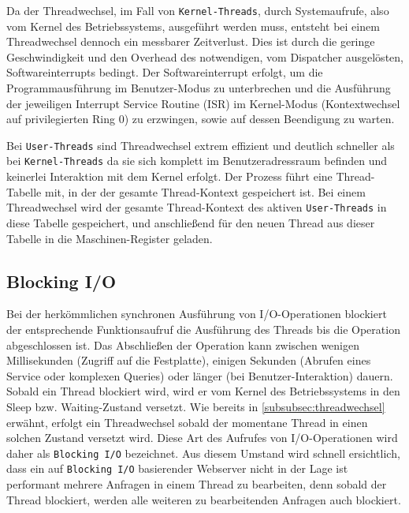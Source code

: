\noindent
Da der Threadwechsel, im Fall von \verb|Kernel-Threads|, durch Systemaufrufe, also vom Kernel des Betriebssystems, ausgeführt werden muss, entsteht
bei einem Threadwechsel dennoch ein messbarer Zeitverlust.
Dies ist durch die geringe Geschwindigkeit und den Overhead des notwendigen, vom Dispatcher ausgelösten, Softwareinterrupts bedingt.
Der Softwareinterrupt erfolgt, um die Programmausführung im Benutzer-Modus zu unterbrechen und die Ausführung der jeweiligen Interrupt Service Routine (ISR) im
Kernel-Modus (Kontextwechsel auf privilegierten Ring 0) zu erzwingen, sowie auf dessen Beendigung zu warten.

Bei \verb|User-Threads| sind Threadwechsel extrem effizient und deutlich schneller als bei \verb|Kernel-Threads|
da sie sich komplett im Benutzeradressraum befinden und keinerlei Interaktion mit dem Kernel erfolgt.
Der Prozess führt eine Thread-Tabelle mit, in der der gesamte Thread-Kontext gespeichert ist.
Bei einem Threadwechsel wird der gesamte Thread-Kontext des aktiven \verb|User-Threads| in diese Tabelle gespeichert, und anschließend für den neuen Thread
aus dieser Tabelle in die Maschinen-Register geladen.
\parencite[Kapitel 2.2.6 Thread Scheduling]{Tanenbaum2016}

\subsection{Blocking I/O}
\label{subsec:blocking-i/o}
Bei der herkömmlichen synchronen Ausführung von I/O-Operationen blockiert der entsprechende Funktionsaufruf die Ausführung des
Threads bis die Operation abgeschlossen ist. Das Abschließen der Operation kann zwischen wenigen Millisekunden (Zugriff auf die Festplatte),
einigen Sekunden (Abrufen eines Service oder komplexen Queries) oder länger (bei Benutzer-Interaktion) dauern.
Sobald ein Thread blockiert wird, wird er vom Kernel des Betriebssystems in den Sleep bzw. Waiting-Zustand versetzt.
Wie bereits in \ref{subsubsec:threadwechsel} erwähnt, erfolgt ein Threadwechsel sobald der momentane Thread in einen solchen Zustand
versetzt wird.
Diese Art des Aufrufes von I/O-Operationen wird daher als \verb|Blocking I/O| bezeichnet.
Aus diesem Umstand wird schnell ersichtlich, dass ein auf \verb|Blocking I/O| basierender Webserver nicht in der Lage ist
performant mehrere Anfragen in einem Thread zu bearbeiten, denn sobald der Thread blockiert, werden alle weiteren zu bearbeitenden Anfragen
auch blockiert.
